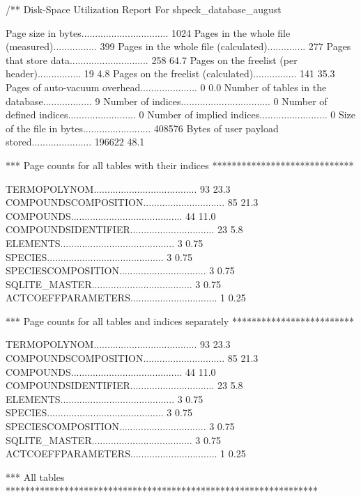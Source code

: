 /** Disk-Space Utilization Report For shpeck_database_august

Page size in bytes................................ 1024      
Pages in the whole file (measured)................ 399       
Pages in the whole file (calculated).............. 277       
Pages that store data............................. 258         64.7%
Pages on the freelist (per header)................ 19           4.8%
Pages on the freelist (calculated)................ 141         35.3%
Pages of auto-vacuum overhead..................... 0            0.0%
Number of tables in the database.................. 9         
Number of indices................................. 0         
Number of defined indices......................... 0         
Number of implied indices......................... 0         
Size of the file in bytes......................... 408576    
Bytes of user payload stored...................... 196622      48.1%

*** Page counts for all tables with their indices *****************************

TERMOPOLYNOM...................................... 93          23.3%
COMPOUNDSCOMPOSITION.............................. 85          21.3%
COMPOUNDS......................................... 44          11.0%
COMPOUNDSIDENTIFIER............................... 23           5.8%
ELEMENTS.......................................... 3            0.75%
SPECIES........................................... 3            0.75%
SPECIESCOMPOSITION................................ 3            0.75%
SQLITE_MASTER..................................... 3            0.75%
ACTCOEFFPARAMETERS................................ 1            0.25%

*** Page counts for all tables and indices separately *************************

TERMOPOLYNOM...................................... 93          23.3%
COMPOUNDSCOMPOSITION.............................. 85          21.3%
COMPOUNDS......................................... 44          11.0%
COMPOUNDSIDENTIFIER............................... 23           5.8%
ELEMENTS.......................................... 3            0.75%
SPECIES........................................... 3            0.75%
SPECIESCOMPOSITION................................ 3            0.75%
SQLITE_MASTER..................................... 3            0.75%
ACTCOEFFPARAMETERS................................ 1            0.25%

*** All tables ****************************************************************


